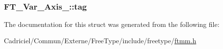 \hypertarget{struct_f_t___var___axis___a01ef9396e34e740c2d2b8c7117094624}{
\subsubsection[{tag}]{ F\-T\-\_\-\-Var\-\_\-\-Axis\-\_\-\-::tag}}\label{struct_f_t___var___axis___a01ef9396e34e740c2d2b8c7117094624}


The documentation for this struct was generated from the following file\-:\begin{DoxyCompactItemize}
\item 
Cadriciel/\-Commun/\-Externe/\-Free\-Type/include/freetype/\hyperlink{ftmm_8h}{ftmm.\-h}\end{DoxyCompactItemize}

